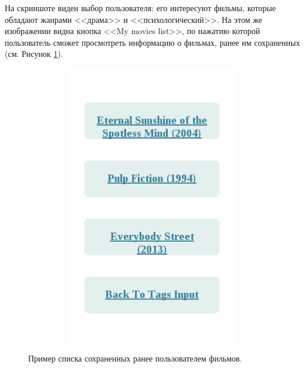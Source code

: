 На скриншоте виден выбор пользователя: его интересуют фильмы, которые обладают
жанрами
<<драма>> и <<психологический>>. На этом же изображении
видна кнопка <<My movies list>>, по нажатию которой пользователь
сможет просмотреть информацию о фильмах, ранее им сохраненных
(см. Рисунок \ref{pics:save}).
\begin{figure}
	\label{pics:save}
\caption{Пример списка сохраненных ранее пользователем фильмов.}
	\label{pics:save}
\begin{center}
  \includegraphics[width=5in,height=5in]{pics/ml-mylist.png}
\end{center}
\end{figure}

